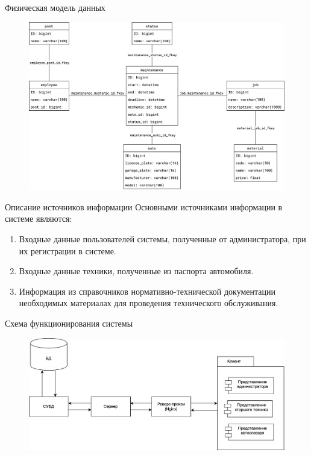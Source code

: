 \documentclass{beamer}
\begin{document}
\begin{frame}
	{Физическая модель данных}
    \begin{figure}[H]
        \centering
        \includegraphics[keepaspectratio,width=\textwidth]{3/images/3_1_db_physical.png}
    \end{figure}
\end{frame}

\begin{frame}
	{Описание источников информации}
    Основными источниками информации в системе являются:
    \begin{enumerate}
        \item Входные данные пользователей системы, полученные от администратора,
            при их регистрации в системе.
        \item Входные данные техники, полученные из паспорта автомобиля.
        \item Информация из справочников нормативно-технической документации
            необходимых материалах для проведения технического обслуживания.
    \end{enumerate}
\end{frame}

\begin{frame}
    {Схема функционирования системы}
    \begin{figure}[H]
        \centering
        \includegraphics[keepaspectratio,width=\textwidth]{presentation/images/modules.png}
    \end{figure}
\end{frame}
\end{document}
